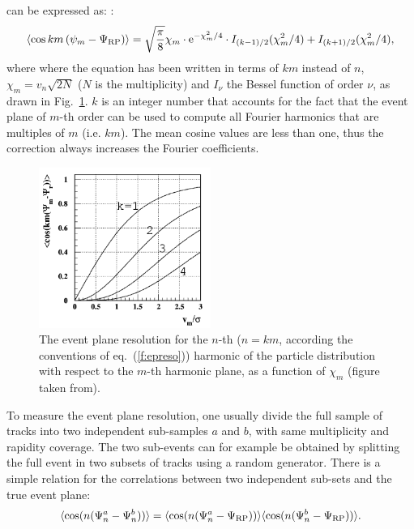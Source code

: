 can be expressed as:
\cite{Poskanzer:1998yz}:
\begin{equation}
\label{f:epreso}
\left\langle \cos km\left( \psi_m-\Psi_{\rm RP}\right)\right\rangle = \sqrt{\dfrac{\pi }{8}} \chi_m \cdot {\rm e}^{-\chi_m^2/4} \cdot I_{(k-1)/2}(\chi_m^2/4)+I_{(k+1)/2}(\chi_m^2/4),
\end{equation}
where where the equation has been written in terms of $km$ 
instead of $n$, $\chi_m=v_n\sqrt{2N}$ ($N$ is the multiplicity) and $I_\nu$ the Bessel function of order $\nu$, as drawn in Fig.~\ref{fig:resoBessel}.
$k$ is an integer number that accounts for the fact that the event plane of $m$-th order can be used to compute all Fourier harmonics that are multiples
of $m$ (i.e. $km$).
The mean cosine values are less than one, thus the correction always increases the Fourier coefficients.
\begin{figure}
\centering
 \includegraphics[width=0.5\textwidth]{FigCap5/resolBessel.png}
 \caption[Event plane resolution vs $\chi_m$]{The event plane resolution for the $n$-th ($n=km$, according the conventions of eq.~(\ref{f:epreso})) harmonic of the particle distribution with respect to the $m$-th harmonic plane, as a function of $\chi_m$ (figure taken from).}
 \label{fig:resoBessel}
\end{figure}
To measure the event plane resolution, one usually divide the
full sample of tracks into two independent sub-samples 
$a$ and $b$, with same multiplicity and rapidity coverage.
The two sub-events can for example be obtained by 
splitting the full event in two subsets of tracks using a random generator.
There is a simple relation for the correlations between 
two independent sub-sets and the true event plane:
\begin{equation}
\langle {\rm cos} (n({\rm \Psi}^a_n-{\rm \Psi}^b_n)) \rangle = 
\langle {\rm cos} (n({\rm \Psi}^a_n-{\rm \Psi}_{\rm RP})) \rangle \langle {\rm cos} (n({\rm \Psi}^b_n-{\rm \Psi}_{\rm RP})) \rangle .
\end{equation}

